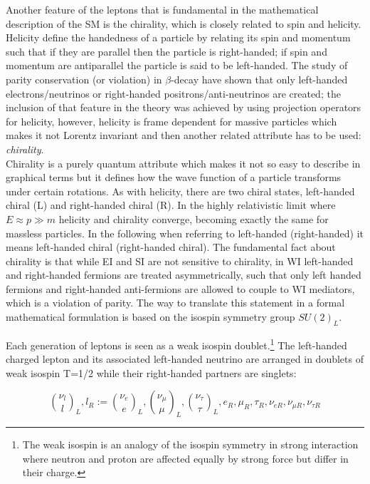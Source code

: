\noindent Another feature of the leptons that is fundamental in the mathematical description of the SM is the chirality, which is closely related to spin and helicity. Helicity define the handedness of a particle by relating its spin and momentum such that if they are parallel then the particle is right-handed; if spin and momentum are antiparallel the particle is said to be left-handed. The study of parity conservation (or violation) in $\beta$-decay have shown that only left-handed electrons/neutrinos or right-handed positrons/anti-neutrinos are created\cite{goldhaber}; the inclusion of that feature in the theory was achieved by using projection operators for helicity, however, helicity is frame dependent for massive particles which makes it not Lorentz invariant and then another related attribute has to be used: \textit{chirality}.\\

\noindent Chirality is a purely quantum attribute which makes it not so easy to describe in graphical terms but it defines how the wave function of a particle transforms under certain rotations. As with helicity, there are two chiral states, left-handed chiral (L) and right-handed chiral (R). In the highly relativistic limit where $E\approx p \gg m$ helicity and chirality converge, becoming exactly the same for massless particles.
\noindent In the following when referring to left-handed (right-handed) it means left-handed chiral (right-handed chiral). The fundamental fact about chirality is that while EI and SI are not sensitive to chirality, in WI left-handed and right-handed fermions are treated asymmetrically, such that only left handed fermions and right-handed anti-fermions are allowed to couple to WI mediators, which is a violation of parity. The way to translate this statement in a formal mathematical formulation is based on the isospin symmetry group $SU(2)_L$.   

\noindent Each generation of leptons is seen as a weak isospin doublet.\footnote{The weak isospin is an analogy of the isospin symmetry in strong interaction where neutron and proton are affected equally by strong force but differ in their charge.} The left-handed charged lepton and its associated left-handed neutrino are arranged in doublets of weak isospin T=1/2 while their right-handed partners are singlets:

\begin{equation}
\binom{\nu_l}{l}_L , l_R := \binom{\nu_e}{e}_L , \binom{\nu_\mu}{\mu}_L, \binom{\nu_\tau}{\tau}_L, e_R, \mu_R, \tau_R, \nu_{eR}, \nu_{\mu R}, \nu_{\tau R}
\label{lepton_multiplets}
\end{equation}

